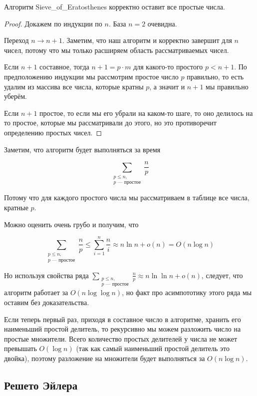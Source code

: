 \documentclass[a4paper, 12pt]{article}
\begin{document}
\begin{Lemma}
 Алгоритм Sieve\_of\_Eratosthenes корректно оставит все простые числа.
\end{Lemma}

\begin{proof}
  Докажем по индукции по $n$. База $n = 2$ очевидна.

  Переход $n \to n + 1$. Заметим, что наш алгоритм и корректно завершит
  для $n$ чисел, потому что мы только расширяем область рассматриваемых чисел.

  Если $n + 1$ составное, тогда $n + 1 = p \cdot m $ для какого-то простого $p < n + 1$.
  По предположению индукции мы рассмотрим простое число $p$
  правильно, то есть удалим из массива все числа, которые
  кратны $p$, а значит и $n + 1$ мы правильно уберём.

  Если $n + 1$ простое, то если мы его убрали на каком-то шаге, то оно делилось
  на то простое, которые мы рассматривали до этого, но это противоречит определению
  простых чисел.
\end{proof}

Заметим, что алгоритм будет выполняться за время

\[
  \sum_{\substack{p \leqslant n,\\ p \text{ --- простое}}} \frac{n}{p}
\]

Потому что для каждого простого числа мы рассматриваем в таблице все числа,
кратные $p$.

Можно оценить очень грубо и получим, что

\[
  \sum_{\substack{p \leqslant n,\\ p \text{ --- простое}}} \frac{n}{p} \leqslant \sum_{i = 1}^{n} \frac{n}{i} \approx n\ln n + o(n) = O(n \log n)
\]

Но используя свойства ряда $\sum\limits_{\substack{p \leqslant n,\\ p \text{ --- простое}}} \frac{n}{p}
\approx n\ln\ln n + o(n)$, следует, что алгоритм работает за $O(n \log\log n)$, 
но факт про асимпототику этого ряда мы оставим без доказательства.

Если теперь первый раз, приходя в составное число в алгоритме, хранить его
наименьший простой делитель, то рекурсивно мы можем разложить
число на простые множители. Всего количество простых делителей у числа не может превышать $O(\log n)$ 
(так как самый наименьший простой делитель это двойка), поэтому разложение
на множители будет выполняться за $O(n \log n)$.

\subsection{Решето Эйлера}
\end{document}
